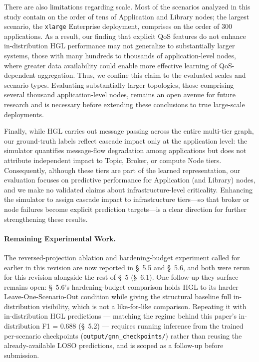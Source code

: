\documentclass[review]{elsarticle}
\begin{document}
There are also limitations regarding scale. Most of the scenarios analyzed in this study contain on
the order of tens of Application and Library nodes; the largest scenario, the \texttt{xlarge}
Enterprise deployment, comprises on the order of 300 applications. As a result, our finding that
explicit QoS features do not enhance in-distribution HGL performance may not generalize to
substantially larger systems, those with many hundreds to thousands of application-level nodes,
where greater data availability could enable more effective learning of QoS-dependent aggregation.
Thus, we confine this claim to the evaluated scales and scenario types. Evaluating substantially
larger topologies, those comprising several thousand application-level nodes, remains an open
avenue for future research and is necessary before extending these conclusions to true large-scale
deployments.

Finally, while HGL carries out message passing across the entire multi-tier graph, our
ground-truth labels reflect cascade impact only at the application level: the simulator quantifies
message-flow degradation among applications but does not attribute independent impact to Topic,
Broker, or compute Node tiers. Consequently, although these tiers are part of the learned
representation, our evaluation focuses on predictive performance for Application (and Library)
nodes, and we make no validated claims about infrastructure-level criticality. Enhancing the
simulator to assign cascade impact to infrastructure tiers---so that broker or node failures become
explicit prediction targets---is a clear direction for further strengthening these results.

\paragraph{Remaining Experimental Work.} The reversed-projection ablation and hardening-budget
experiment called for earlier in this revision are now reported in \S~5.5 and \S~5.6, and both
were rerun for this revision alongside the rest of \S~5 (\S~6.1). One follow-up they surface
remains open: \S~5.6's hardening-budget comparison holds HGL to its harder Leave-One-Scenario-Out
condition while giving the structural baseline full in-distribution visibility, which is not a
like-for-like comparison. Repeating it with in-distribution HGL predictions --- matching the regime
behind this paper's in-distribution F1 = 0.688 (\S~5.2) --- requires running inference from the
trained per-scenario checkpoints (\texttt{output/gnn\_checkpoints/}) rather than reusing the
already-available LOSO predictions, and is scoped as a follow-up before submission.
\end{document}
